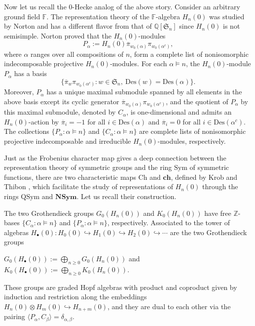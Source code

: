 \documentclass[ALCO,ThmDefs,published]{cedram}
\newcommand{\symm}{{\mathfrak{S}}}
\newcommand{\QQ}{{\mathbb {Q}}}
\newcommand{\FF}{{\mathbb{F}}}
\theoremstyle{plain}
\newcommand{\Des}{{\mathrm {Des}}}
\newcommand{\NSym}{{\mathbf {NSym}}}
\newcommand{\Sym}{{\mathrm {Sym}}}
\newcommand{\QSym}{{\mathrm {QSym}}}
\newcommand{\Ch}{{\mathrm {Ch}}}
\newcommand{\ch}{{\mathbf {ch}}}
\newcommand{\symm}{{\mathfrak{S}}}
\newcommand{\QQ}{{\mathbb {Q}}}
\newcommand{\ZZ}{{\mathbb {Z}}}
\newcommand{\FF}{{\mathbb{F}}}
\newcommand{\pib}{\overline{\pi}}
\begin{document}
Now let us recall the 0-Hecke analog of the above story.
Consider an arbitrary ground field $\FF$.
The representation theory of the $\FF$-algebra $H_n(0)$ was studied by Norton \cite{Norton}
and has a different flavor from that of $\QQ[\symm_n]$ since $H_n(0)$ is not semisimple.
Norton \cite{Norton} proved that %
the $H_n(0)$-modules 
\begin{equation}
P_{\alpha} := H_n(0) \pib_{w_0(\alpha)} \pi_{w_0(\alpha^c)},
\end{equation}
where $\alpha$ ranges over all compositions of $n$, form a complete list of nonisomorphic
 indecomposable projective 
$H_n(0)$-modules.  
For each $\alpha\models n$, the $H_n(0)$-module $P_\alpha$ has a basis 
\[ \{ \pib_w \pi_{w_0(\alpha^c)} : w\in\symm_n,\ \Des(w) = \Des(\alpha) \}. \]
Moreover, $P_\alpha$ has a unique maximal submodule spanned by all elements in the above basis except its cyclic generator $\pib_{w_0(\alpha)} \pi_{w_0(\alpha^c)}$, and the quotient of $P_\alpha$ by this maximal submodule, denoted by $C_\alpha$, is one-dimensional and admits an $H_n(0)$-action by $\pib_i = -1$ for all $i\in \Des(\alpha)$ and $\pib_i = 0$ for all $i\in \Des(\alpha^c)$. 
The collections $\{ P_\alpha:\alpha\models n\}$ and $\{ C_\alpha: \alpha\models n\}$ are complete lists of nonisomorphic projective indecomposable and irreducible $H_n(0)$-modules, respectively.

Just as the Frobenius character map gives a deep connection between the representation
theory of symmetric groups and the ring $\Sym$ of symmetric functions, there are two characteristic maps 
$\Ch$ and $\ch$, defined by Krob and Thibon \cite{KT}, which facilitate the study of representations of $H_n(0)$ through the rings 
$\QSym$ and $\NSym$.  Let us recall their construction.

The two Grothendieck groups $G_0(H_n(0))$ and $K_0(H_n(0))$ have 
free $\ZZ$-bases $\{C_\alpha:\alpha\models n\}$ and $\{P_\alpha:\alpha\models n\}$, respectively. 
Associated to the tower of algebras 
$H_{\bullet}(0) : H_0(0) \hookrightarrow H_1(0) \hookrightarrow H_2(0) \hookrightarrow \cdots$
are the two Grothendieck groups
\begin{center}
$G_0(H_{\bullet}(0)) := \bigoplus_{n \geq 0} G_0(H_n(0))$ and 
$K_0(H_{\bullet}(0)) := \bigoplus_{n \geq 0} K_0(H_n(0))$.
\end{center}
These groups are graded Hopf algebras with product and coproduct given by induction and restriction along the embeddings $H_n(0) \otimes H_m(0) \hookrightarrow H_{n+m}(0)$, and they are dual to each other via the pairing $\langle P_\alpha, C_\beta \rangle = \delta_{\alpha,\beta}$.
\end{document}
